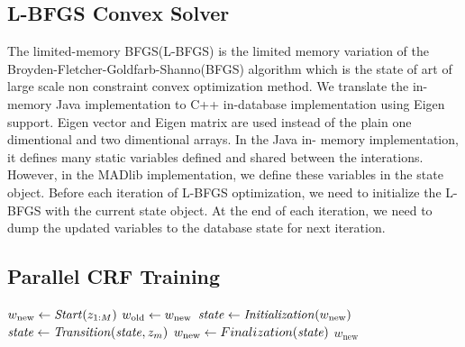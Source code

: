 \subsection{L-BFGS Convex Solver}

The limited-memory BFGS(L-BFGS) \cite{DBLP:journals/siamjo/MoralesN00} is the
limited memory variation of the Broyden-Fletcher-Goldfarb-Shanno(BFGS) algorithm
which is the state of art of large scale non constraint convex optimization
method. We translate the in-memory Java implementation to C++ in-database
implementation using Eigen support. Eigen vector and Eigen matrix are used
instead of the plain one dimentional and two dimentional arrays. In the Java in-
memory implementation, it defines many static variables defined and shared
between the interations. However, in the MADlib implementation, we define these
variables in the state object. Before each iteration of L-BFGS optimization, we
need to initialize the L-BFGS with the current state object.  At the end of each
iteration, we need to dump the updated variables to the database state for next
iteration.


\subsection{Parallel CRF Training}
\begin{algorithm} \label{alg:CRF training}
\begin{algorithmic}[1]
	\State $w_\text{new} \leftarrow \mathit{Start}(z_{1:M})$
	\Repeat
        \State $w_\text{old} \leftarrow w_\text{new}$
        \State $\mathit{state} \leftarrow \mathit{Initialization}(w_\text{new})$
		 
			\State $\mathit{state} \leftarrow \mathit{Transition}(\mathit{state}, z_m)$
		\EndFor
		\State $w_\text{new} \leftarrow Finalization(\mathit{state})$ 
    \State \Return $w_\text{new}$
\end{algorithmic}
\end{algorithm}

